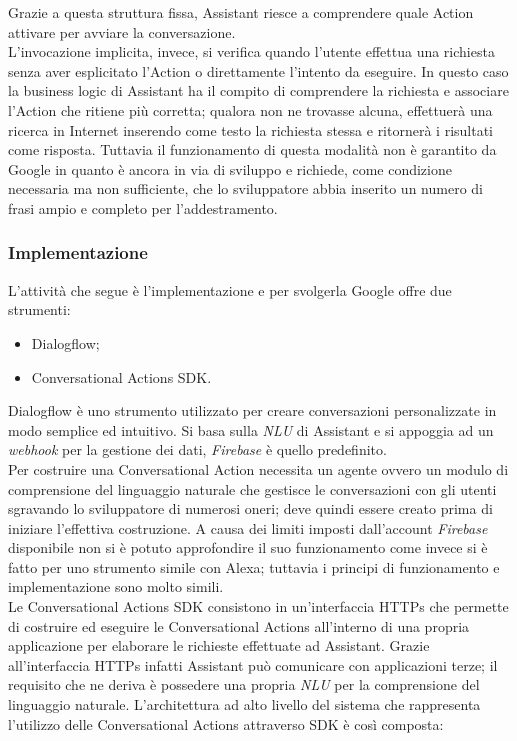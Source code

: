 		Grazie a questa struttura fissa, Assistant riesce a comprendere quale Action attivare per avviare la conversazione. \\
		L'invocazione implicita, invece, si verifica quando l'utente effettua una richiesta senza aver esplicitato l'Action o direttamente l'intento da eseguire. In questo caso la business logic di Assistant ha il compito di comprendere la richiesta e associare l'Action che ritiene più corretta; qualora non ne trovasse alcuna, effettuerà una ricerca in Internet inserendo come testo la richiesta stessa e ritornerà i risultati come risposta. Tuttavia il funzionamento di questa modalità non è garantito da Google in quanto è ancora in via di sviluppo e richiede, come condizione necessaria ma non sufficiente, che lo sviluppatore abbia inserito un numero di frasi ampio e completo per l'addestramento.
		\subsubsection{Implementazione}
		L'attività che segue è l'implementazione e per svolgerla Google offre due strumenti:
		\begin{itemize}
			\item Dialogflow;
			\item Conversational Actions SDK.
		\end{itemize}
		Dialogflow è uno strumento utilizzato per creare conversazioni personalizzate in modo semplice ed intuitivo. Si basa sulla \textit{NLU} di Assistant e si appoggia ad un \textit{webhook} per la gestione dei dati, \textit{Firebase} è quello predefinito. \\
		Per costruire una Conversational Action necessita un agente ovvero un modulo di comprensione del linguaggio naturale che gestisce le conversazioni con gli utenti sgravando lo sviluppatore di numerosi oneri; deve quindi essere creato prima di iniziare l'effettiva costruzione. A causa dei limiti imposti dall'account \textit{Firebase} disponibile non si è potuto approfondire il suo funzionamento come invece si è fatto per uno strumento simile con Alexa; tuttavia i principi di funzionamento e implementazione sono molto simili. \\
		Le Conversational Actions SDK consistono in un'interfaccia HTTPs che permette di costruire ed eseguire le Conversational Actions all'interno di una propria applicazione per elaborare le richieste effettuate ad Assistant. Grazie all'interfaccia HTTPs infatti Assistant può comunicare con applicazioni terze; il requisito che ne deriva è possedere una propria \textit{NLU} per la comprensione del linguaggio naturale. L'architettura ad alto livello del sistema che rappresenta l'utilizzo delle Conversational Actions attraverso SDK è così composta:
